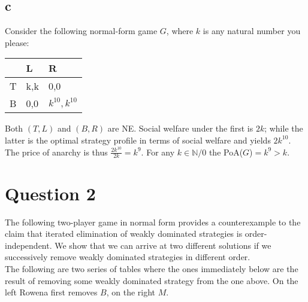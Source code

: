 \documentclass[10pt,a4paper]{article}
\begin{document}
\subsection*{c}
Consider the following normal-form game $G$, where $k$ is any natural number you please:
\begin{table}[h]
\begin{tabular}{|l|l|l|}
\hline
  & L   & R               \\ \hline
T & k,k & 0,0             \\ \hline
B & 0,0 & $k^{10},k^{10}$ \\ \hline
\end{tabular}
\end{table}
Both $(T,L)$ and $(B,R)$ are NE. Social welfare under the first is $2k$; while the latter is the optimal strategy profile in terms of social welfare and yields $2k^{10}$. The price of anarchy is thus $\tfrac{2k^{10}}{2k}=k^{9}$. For any $k\in \mathbb{N}/{0}$ the PoA($G$)$=k^{9}>k$.
\section*{Question 2}
The following two-player game in normal form provides a counterexample to the claim that iterated elimination of weakly dominated strategies is order-independent. We show that we can arrive at two different solutions if we successively remove weakly dominated strategies in different order.\\
The following are two series of tables where the ones immediately below are the result of removing some weakly dominated strategy from the one above. On the left Rowena first removes $B$, on the right $M$.
\end{document}
